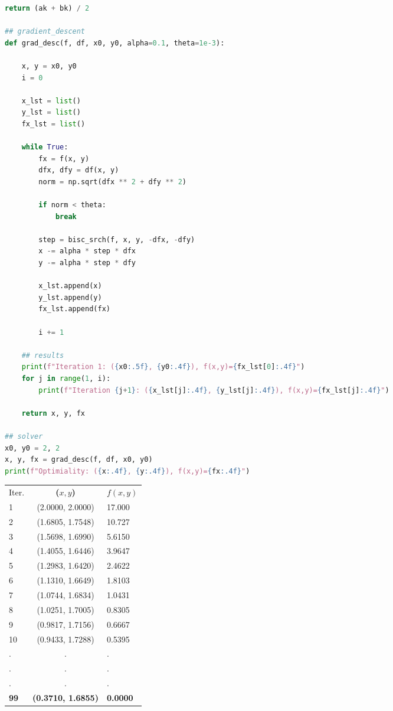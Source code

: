 \documentclass{article}
\begin{document}
\begin{enumerate}
\begin{lstlisting}[language=Python, title=Fig. Python 2]
    return (ak + bk) / 2

## gradient_descent
def grad_desc(f, df, x0, y0, alpha=0.1, theta=1e-3):

    x, y = x0, y0
    i = 0
    
    x_lst = list()
    y_lst = list()
    fx_lst = list()
    
    while True:
        fx = f(x, y)
        dfx, dfy = df(x, y)
        norm = np.sqrt(dfx ** 2 + dfy ** 2)
        
        if norm < theta:
            break
        
        step = bisc_srch(f, x, y, -dfx, -dfy)
        x -= alpha * step * dfx
        y -= alpha * step * dfy
        
        x_lst.append(x)
        y_lst.append(y)
        fx_lst.append(fx)
        
        i += 1

    ## results    
    print(f"Iteration 1: ({x0:.5f}, {y0:.4f}), f(x,y)={fx_lst[0]:.4f}")
    for j in range(1, i):
        print(f"Iteration {j+1}: ({x_lst[j]:.4f}, {y_lst[j]:.4f}), f(x,y)={fx_lst[j]:.4f}")
        
    return x, y, fx

## solver
x0, y0 = 2, 2
x, y, fx = grad_desc(f, df, x0, y0)
print(f"Optimiality: ({x:.4f}, {y:.4f}), f(x,y)={fx:.4f}")
\end{lstlisting}

    \begin{center}
        \begin{tabular}{lcl}
            Iter. & \textbf{($x, y$)} & \textbf{$f(x,y)$} \\
            1 & (2.0000, 2.0000) & 17.000 \\
            2 & (1.6805, 1.7548) & 10.727 \\
            3 & (1.5698, 1.6990) & 5.6150 \\
            4 & (1.4055, 1.6446) & 3.9647 \\
            5 & (1.2983, 1.6420) & 2.4622 \\
            6 & (1.1310, 1.6649) & 1.8103 \\
            7 & (1.0744, 1.6834) & 1.0431 \\
            8 & (1.0251, 1.7005) & 0.8305 \\
            9 & (0.9817, 1.7156) & 0.6667 \\
            10 & (0.9433, 1.7288) & 0.5395 \\
            . & . & . \\
            . & . & . \\
            . & . & . \\
            \textbf{99} & \textbf{(0.3710, 1.6855)} & \textbf{0.0000}
        \end{tabular}
    \end{center}\\~\\


\end{enumerate}
\end{document}
